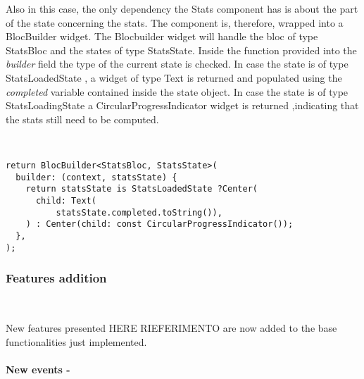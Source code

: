 Also in this case, the only dependency the Stats component has is about the part of the state concerning the stats. The component is, therefore, wrapped into a BlocBuilder widget. The Blocbuilder widget will handle the bloc of type StatsBloc and the states of type StatsState. Inside the function provided into the \textit{builder} field the type of the current state is checked. In case the state is of type StatsLoadedState , a widget of type Text is returned and populated using the \textit{completed} variable contained inside the state object. In case the state is of type StatsLoadingState a CircularProgressIndicator widget is returned ,indicating that the stats still need to be computed.
\begin{code}
\mbox{}\\
 \mbox{}
\label{code:2.14}
\begin{verbatim}
return BlocBuilder<StatsBloc, StatsState>(
  builder: (context, statsState) {
    return statsState is StatsLoadedState ?Center(
      child: Text(
          statsState.completed.toString()),
    ) : Center(child: const CircularProgressIndicator());
  },
);
\end{verbatim}
\mbox{}
\end{code}



\subsubsection{Features addition} \mbox{}\\ \label{par:todo_app_inherited_widget_introduction}


New features presented HERE RIEFERIMENTO are now added  to the base functionalities just implemented.

\paragraph{New events - }
\label{subpar:todo_app_bloc_core_state}

